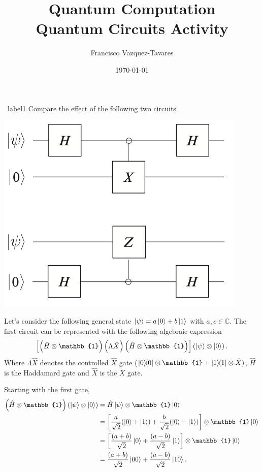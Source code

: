 \documentclass[a4paper]{tufte-handout} %
\title{Quantum Computation\\ Quantum Circuits Activity}
\author{Francisco Vazquez-Tavares}
\date{\today} %
\begin{document}
\maketitle %
\justifying


\begin{prob}{~}{label1}
    Compare the effect of the following two circuits

    \includegraphics[width=0.9\textwidth]{imgs/image-7.png}

\end{prob}

Let's consider the following general state $\ket{\psi}=a\ket{0} + b\ket{1}$ with $a,c\in\mathbb{C}$.
The first circuit can be represented with the following algebraic expression
\begin{gather*}
    \left[\left(\hat{H}\otimes\mathbb{1}\right)\left(\Lambda\hat{X}\right)\left(\hat{H}\otimes\mathbb{1}\right)\right]\left(\ket{\psi}\otimes\ket{0}\right).
\end{gather*}
Where $\Lambda\hat{X}$ denotes the controlled $\hat{X}$ gate ($\dyad{0}\otimes\mathbb{1} + \dyad{1}\otimes\hat{X})$,
$\hat{H}$ is the Haddamard gate and $\hat{X}$ is the $X$ gate.

Starting with the first gate,
\begin{align*}
    \left(\hat{H}\otimes\mathbb{1}\right)\left(\ket{\psi}\otimes\ket{0}\right) &= \hat{H}\ket{\psi}\otimes\mathbb{1}\ket{0} \\
                                                                               &= \left[\frac{a}{\sqrt{2}}\qty(\ket{0}+\ket{1})+\frac{b}{\sqrt{2}}\qty(\ket{0}-\ket{1})\right]\otimes\mathbb{1}\ket{0} \\
                                                                               &= \left[\frac{\qty(a+b)}{\sqrt{2}}\ket{0}+\frac{\qty(a-b)}{\sqrt{2}}\ket{1}\right]\otimes\mathbb{1}\ket{0} \\
                                                                               &= \frac{\qty(a+b)}{\sqrt{2}}\ket{00}+\frac{\qty(a-b)}{\sqrt{2}}\ket{10}.
\end{align*}
\end{document}
